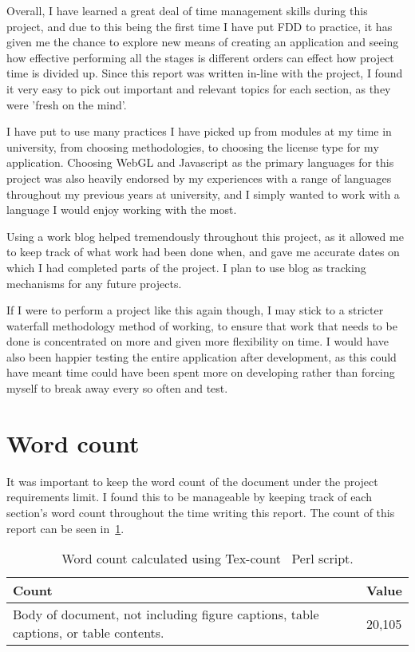 Overall, I have learned a great deal of time management skills during this project, and due to this being the first time I have put FDD to practice, it has given me the chance to explore new means of creating an application and seeing how effective performing all the stages is different orders can effect how project time is divided up. Since this report was written in-line with the project, I found it very easy to pick out important and relevant topics for each section, as they were 'fresh on the mind'.

I have put to use many practices I have picked up from modules at my time in university, from choosing methodologies, to choosing the license type for my application. Choosing WebGL and Javascript as the primary languages for this project was also heavily endorsed by my experiences with a range of languages throughout my previous years at university, and I simply wanted to work with a language I would enjoy working with the most.

Using a work blog helped tremendously throughout this project, as it allowed me to keep track of what work had been done when, and gave me accurate dates on which I had completed parts of the project. I plan to use blog as tracking mechanisms for any future projects.

If I were to perform a project like this again though, I may stick to a stricter waterfall methodology method of working, to ensure that work that needs to be done is concentrated on more and given more flexibility on time. I would have also been happier testing the entire application after development, as this could have meant time could have been spent more on developing rather than forcing myself to break away every so often and test.

\clearpage

\section{Word count}
It was important to keep the word count of the document under the project requirements limit. I found this to be manageable by keeping track of each section's word count throughout the time writing this report. The count of this report can be seen in~\ref{tbl:count}.

\begin{table}[h!]
	\caption{Word count calculated using Tex-count~\cite{count} Perl script.}
	\begin{tabular}{|l|l|}
		\hline
		\textbf{Count} & \textbf{Value}                                                                \\ \hline
		Body of document, not including figure captions, table captions, or table contents.   &  20,105\\ \hline
	\end{tabular}
	\label{tbl:count}
\end{table}

